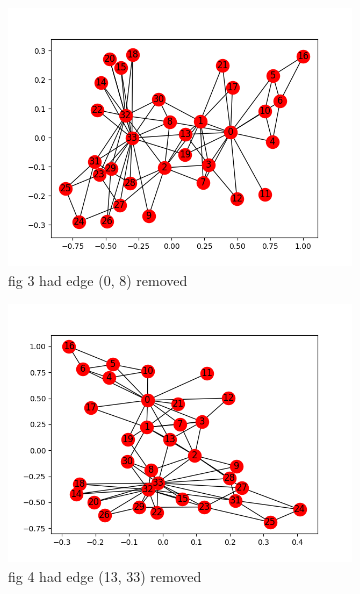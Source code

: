 \documentclass[10pt,letterpaper]{article}
\begin{document}
\begin{figure}[H]
\begin{subfigure}[b]{0.4\linewidth}
     \includegraphics[width=\linewidth]{karate03.png} 
     \caption{fig 3 had edge (0, 8) removed}
  \end{subfigure}
   \begin{subfigure}[b]{0.4\linewidth}
     \includegraphics[width=\linewidth]{karate04.png} 
     \caption{fig 4 had edge (13, 33) removed}
  \end{subfigure}
   \begin{subfigure}[b]{0.4\linewidth}

\end{subfigure}
\end{figure}
\end{document}
